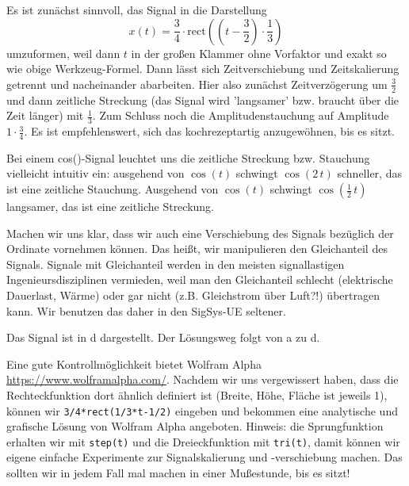 \begin{Ansatz}
Es ist zunächst sinnvoll, das Signal in die Darstellung
\begin{equation}
x(t) = \frac{3}{4} \cdot \mathrm{rect}(\left(t-\frac{3}{2}\right)\cdot \frac{1}{3})
\end{equation}
umzuformen, weil dann $t$ in der großen Klammer ohne Vorfaktor und exakt so wie
obige Werkzeug-Formel.
Dann lässt sich Zeitverschiebung und Zeitskalierung
getrennt und nacheinander abarbeiten. Hier also zunächst Zeitverzögerung um
$\frac{3}{2}$ und dann zeitliche Streckung (das Signal wird 'langsamer' bzw.
braucht über die Zeit länger) mit $\frac{1}{3}$.
%
Zum Schluss noch die Amplitudenstauchung auf Amplitude $1 \cdot \frac{3}{4}$.
%
Es ist empfehlenswert, sich das kochrezeptartig anzugewöhnen, bis es sitzt.

Bei einem cos()-Signal leuchtet uns die zeitliche Streckung bzw. Stauchung vielleicht
intuitiv ein: ausgehend von $\cos(t)$ schwingt $\cos(2\,t)$ schneller, das ist eine
zeitliche Stauchung.
%
Ausgehend von $\cos(t)$ schwingt $\cos(\frac{1}{2}\,t)$
langsamer, das ist eine zeitliche Streckung.

Machen wir uns klar, dass wir auch eine Verschiebung des Signals bezüglich der
Ordinate vornehmen können. Das heißt, wir manipulieren den Gleichanteil des Signals.
%
Signale mit Gleichanteil werden in den meisten signallastigen
Ingenieursdisziplinen vermieden, weil man den Gleichanteil schlecht
(elektrische Dauerlast, Wärme) oder gar nicht (z.B. Gleichstrom über Luft?!)
übertragen kann.
%
Wir benutzen das daher in den SigSys-UE seltener.

\end{Ansatz}
\begin{Loesung}
Das Signal ist in d dargestellt. Der Lösungsweg folgt von
a zu d.

Eine gute Kontrollmöglichkeit bietet Wolfram Alpha
\url{https://www.wolframalpha.com/}.
Nachdem wir uns vergewissert haben, dass die Rechteckfunktion dort ähnlich definiert
ist (Breite, Höhe, Fläche ist jeweils 1), können wir
\verb|3/4*rect(1/3*t-1/2)| eingeben und bekommen eine analytische und grafische
Lösung von Wolfram Alpha angeboten.
Hinweis: die Sprungfunktion erhalten wir mit \verb|step(t)|
und die Dreieckfunktion mit \verb|tri(t)|, damit können wir eigene einfache
Experimente zur Signalskalierung und -verschiebung machen.
%
Das sollten wir in jedem Fall mal machen in einer Mußestunde, bis es sitzt!

\end{Loesung}

